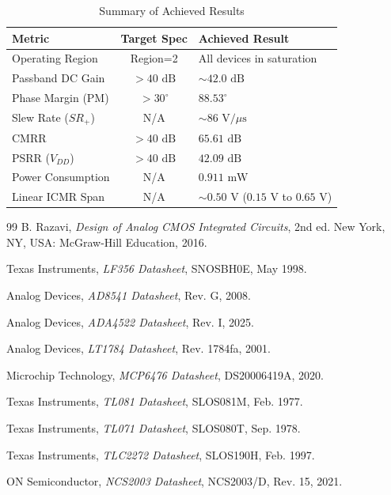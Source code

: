 \documentclass[conference]{IEEEtran}
\begin{document}
\begin{table}[H]
\centering
\caption{Summary of Achieved Results}
\label{tab:final_results}
\small
\begin{tabularx}{\columnwidth}{@{}l c X@{}}
\toprule
\textbf{Metric} & \textbf{Target Spec} & \textbf{Achieved Result} \\
\midrule
Operating Region & Region=2 & All devices in saturation \\
Passband DC Gain & $> 40\text{ dB}$ & $\sim 42.0\text{ dB}$ \\
Phase Margin (PM) & $> 30^\circ$ & $88.53^\circ$ \\
Slew Rate ($SR_+$) & N/A & $\sim 86\text{ V}/\mu\text{s}$ \\
CMRR & $> 40\text{ dB}$ & $65.61\text{ dB}$ \\
PSRR ($V_{DD}$) & $> 40\text{ dB}$ & $42.09\text{ dB}$ \\
Power Consumption & N/A & $0.911\text{ mW}$ \\
Linear ICMR Span & N/A & $\sim 0.50\text{ V}$ ($0.15\text{ V}$ to $0.65\text{ V}$) \\
\bottomrule
\end{tabularx}
\end{table}

\begin{thebibliography}{99}
B. Razavi, \textit{Design of Analog CMOS Integrated Circuits}, 2nd ed. New York, NY, USA: McGraw-Hill Education, 2016.

Texas Instruments, \textit{LF356 Datasheet}, SNOSBH0E, May 1998.

Analog Devices, \textit{AD8541 Datasheet}, Rev. G, 2008.

Analog Devices, \textit{ADA4522 Datasheet}, Rev. I, 2025.

Analog Devices, \textit{LT1784 Datasheet}, Rev. 1784fa, 2001.

Microchip Technology, \textit{MCP6476 Datasheet}, DS20006419A, 2020.

Texas Instruments, \textit{TL081 Datasheet}, SLOS081M, Feb. 1977.

Texas Instruments, \textit{TL071 Datasheet}, SLOS080T, Sep. 1978.

Texas Instruments, \textit{TLC2272 Datasheet}, SLOS190H, Feb. 1997.

ON Semiconductor, \textit{NCS2003 Datasheet}, NCS2003/D, Rev. 15, 2021.
\end{thebibliography}
\end{document}
